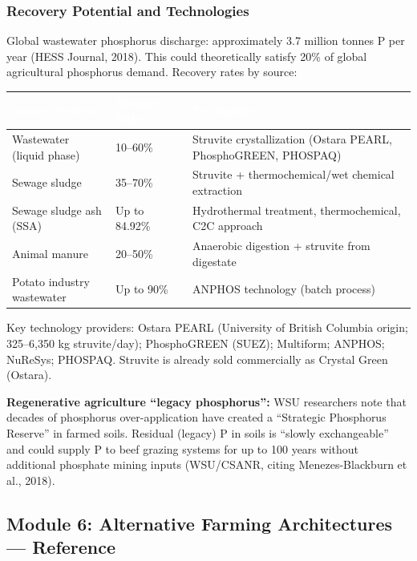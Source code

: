 \documentclass[11pt,letterpaper]{article}
\newcommand{\tableheader}[1]{\textbf{\sffamily\textcolor{white}{#1}}}
\begin{document}
\subsubsection{Recovery Potential and Technologies}

Global wastewater phosphorus discharge: approximately 3.7 million tonnes P per year (HESS Journal, 2018). This could theoretically satisfy 20\% of global agricultural phosphorus demand. Recovery rates by source:

\begin{center}
\begin{tabularx}{\textwidth}{L{4cm}L{3cm}X}
\toprule
{}
\tableheader{Source Stream} & \tableheader{Recovery Rate} & \tableheader{Technology} \\
\midrule
Wastewater (liquid phase) & 10--60\% & Struvite crystallization (Ostara PEARL, PhosphoGREEN, PHOSPAQ) \\
Sewage sludge & 35--70\% & Struvite + thermochemical/wet chemical extraction \\
Sewage sludge ash (SSA) & Up to 84.92\% & Hydrothermal treatment, thermochemical, C2C approach \\
Animal manure & 20--50\% & Anaerobic digestion + struvite from digestate \\
Potato industry wastewater & Up to 90\% & ANPHOS technology (batch process) \\
\bottomrule
\end{tabularx}
\end{center}

Key technology providers: Ostara PEARL (University of British Columbia origin; 325--6,350 kg struvite/day); PhosphoGREEN (SUEZ); Multiform; ANPHOS; NuReSys; PHOSPAQ. Struvite is already sold commercially as Crystal Green (Ostara).

\textbf{Regenerative agriculture ``legacy phosphorus'':} WSU researchers note that decades of phosphorus over-application have created a ``Strategic Phosphorus Reserve'' in farmed soils. Residual (legacy) P in soils is ``slowly exchangeable'' and could supply P to beef grazing systems for up to 100 years without additional phosphate mining inputs (WSU/CSANR, citing Menezes-Blackburn et al., 2018).

\subsection{Module 6: Alternative Farming Architectures --- Reference}
\end{document}
